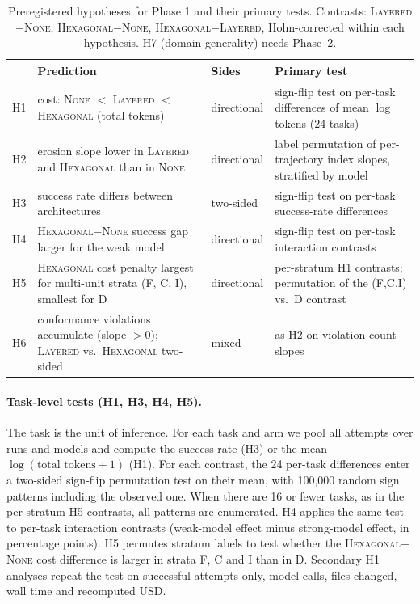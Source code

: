 \documentclass[10pt]{article}
\newcommand{\NONE}{\textsc{None}}
\newcommand{\LAY}{\textsc{Layered}}
\newcommand{\HEX}{\textsc{Hexagonal}}
\begin{document}
\begin{table}[tbp]\centering
\caption{Preregistered hypotheses for Phase 1 and their primary tests. Contrasts: \LAY$-$\NONE,
\HEX$-$\NONE, \HEX$-$\LAY, Holm-corrected within each hypothesis. H7 (domain generality) needs
Phase~2.}
\label{tab:hyp}
\small
\begin{tabularx}{\textwidth}{@{}l>{\raggedright\arraybackslash}p{4.6cm}l>{\raggedright\arraybackslash}X@{}}
\toprule
& Prediction & Sides & Primary test\\
\midrule
H1 & cost: \NONE{} $<$ \LAY{} $<$ \HEX{} (total tokens) & directional & sign-flip test on per-task differences of mean $\log$ tokens (24 tasks)\\
H2 & erosion slope lower in \LAY{} and \HEX{} than in \NONE{} & directional & label permutation of per-trajectory index slopes, stratified by model\\
H3 & success rate differs between architectures & two-sided & sign-flip test on per-task success-rate differences\\
H4 & \HEX$-$\NONE{} success gap larger for the weak model & directional & sign-flip test on per-task interaction contrasts\\
H5 & \HEX{} cost penalty largest for multi-unit strata (F, C, I), smallest for D & directional & per-stratum H1 contrasts; permutation of the (F,C,I) vs.\ D contrast\\
H6 & conformance violations accumulate (slope $>0$); \LAY{} vs.\ \HEX{} two-sided & mixed & as H2 on violation-count slopes\\
\bottomrule
\end{tabularx}
\end{table}

\paragraph{Task-level tests (H1, H3, H4, H5).} The task is the unit of inference. For each task and
arm we pool all attempts over runs and models and compute the success rate (H3) or the mean
$\log(\text{total tokens}+1)$ (H1). For each contrast, the 24 per-task differences enter a two-sided
sign-flip permutation test on their mean, with 100,000 random sign patterns including the observed
one. When there are 16 or fewer tasks, as in the per-stratum H5 contrasts, all patterns are
enumerated. H4 applies the same test to per-task interaction contrasts (weak-model effect minus
strong-model effect, in percentage points). H5 permutes stratum labels to test whether the
\HEX$-$\NONE{} cost difference is larger in strata F, C and I than in D. Secondary H1 analyses
repeat the test on successful attempts only, model calls, files changed, wall time and recomputed
USD.
\end{document}

